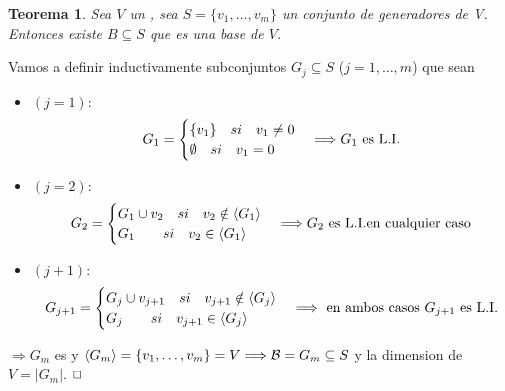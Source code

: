 \documentclass[]{article}
\newtheorem{theorem}{Teorema}
\newenvironment{proof}{\noindent{\bf Prueba:}}{$\hfill \Box$ \vspace{10pt}}
\newcommand{\ida}{\Longrightarrow}
\newcommand{\base}{\mathcal{B}}
\begin{document}
\begin{theorem}
    Sea $V$ un \espvec, sea $S=\{ v_1, \dots ,v_m \}$ un conjunto de generadores de V. Entonces existe
    $B \subseteq S$ que es una base de $V$. 
\end{theorem}
\begin{proof}
    Vamos a definir inductivamente subconjuntos $G_j \subseteq S$ ($j=1,\dots,m$) que sean \li
    \begin{itemize}
        \item $(j=1):$
        \begin{align*}
            G_1=
            \begin{cases}
                \{v_1\} \quad si \quad v_1 \neq 0\\
                \emptyset \quad si \quad v_1 = 0
            \end{cases}
            \ida G_1 \text{ es \li}
        \end{align*}
        \item $(j=2):$
        \begin{align*}
            G_2=
            \begin{cases}
                G_1 \cup {v_2} \quad si \quad v_2 \notin \espgen{G_1}\\
                G_1 \quad\quad si \quad v_2 \in \espgen{G_1}
            \end{cases}
            \ida G_2 \text{ es \li en cualquier caso}
        \end{align*}
        \item $(j+1):$
        \begin{align*}
            G_{j+1}=
            \begin{cases}
                G_j \cup {v_{j+1}} \quad si \quad v_{j+1} \notin \espgen{G_j}\\
                G_j \quad\quad si \quad v_{j+1} \in \espgen{G_j}
            \end{cases}
            \ida \text{ en ambos casos $G_{j+1}$ es \li}
        \end{align*}
    \end{itemize}
    $\ida G_m$ es \li y $\espgen{G_m} = \{ v_1,\dots,v_m \} = V \ida \base = G_m \subseteq S$ y la dimension
    de $V = |G_m|$.
\end{proof}
\end{document}
